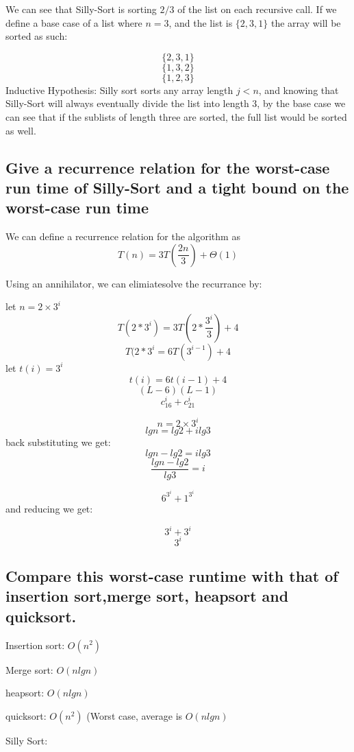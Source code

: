 \documentclass[titlepage]{article}\usepackage[]{graphicx}\usepackage[]{color}
\begin{document}
We can see that Silly-Sort is sorting $2/3$ of the list on each recursive call.
If we define a base case of a list where $n=3$, and the list is $\{ 2,3,1 \} $ the array will be sorted as
such:

\[ \{ 2, 3, 1 \} \] 
  \[ \{ 1, 3, 2 \} \]
  \[ \{ 1, 2, 3 \} \]
Inductive Hypothesis: Silly sort sorts any array length $j<n$, and knowing that
Silly-Sort will always eventually divide the list into length 3, by the base
case we can see that if the sublists of length three are sorted, the full list
would be sorted as well. 


\subsection{ Give a recurrence relation for the worst-case run time of Silly-Sort and a
tight bound on the worst-case run time}

We can define a recurrence relation for the algorithm as 
\[ T(n) = 3T(\frac{2n}{3}) + \Theta(1) \]


Using an annihilator, we can elimiatesolve the recurrance by:

let $n = 2\times3^i$
\[ T(2*3^i) = 3T(2*\frac{3^i}{3}) + 4 \]
\[ T(2*3^i = 6T(3^{i-1}) + 4 \]
let $t(i) = 3^i$
\[ t(i) = 6t(i-1) + 4 \]
\[ (L-6)(L-1) \]
\[ c_16^i + c_21^i \]

\[ n = 2\times3^i \]
\[ lg n = lg2 + i lg3 \] 
back substituting we get:
\[ lg n - lg 2 = i lg3 \]
\[ \frac{lg n - lg 2}{lg 3} = i \]

\[ 6^{3^i} + 1^{3^i} \]
and reducing we get:

\[ 3^i + 3^i \]
\[ 3^i \]

  
\subsection{ Compare this worst-case runtime with that of insertion sort,merge
sort, heapsort and quicksort.}

\begin{listing}
\item Insertion sort: $O(n^2)$
\item Merge sort: $O(nlgn)$
\item heapsort: $O(n lg n)$
\item quicksort: $O(n^2)$ (Worst case, average is $O(n lg n)$
\item Silly Sort: 
\end{listing}
\end{document}
